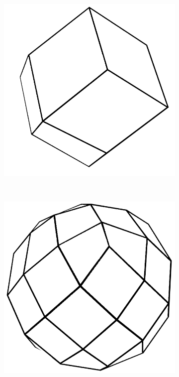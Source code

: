 \begin{figure}
    \centering
    \begin{subfigure}[b]{0.2\textwidth}
        \includegraphics[width=\textwidth]{figures/tessellation/tessellation_healpix1.png}
    \end{subfigure}
    ~ %
    \begin{subfigure}[b]{0.2\textwidth}
        \includegraphics[width=\textwidth]{figures/tessellation/tessellation_healpix2.png}

\end{subfigure}
\end{figure}
